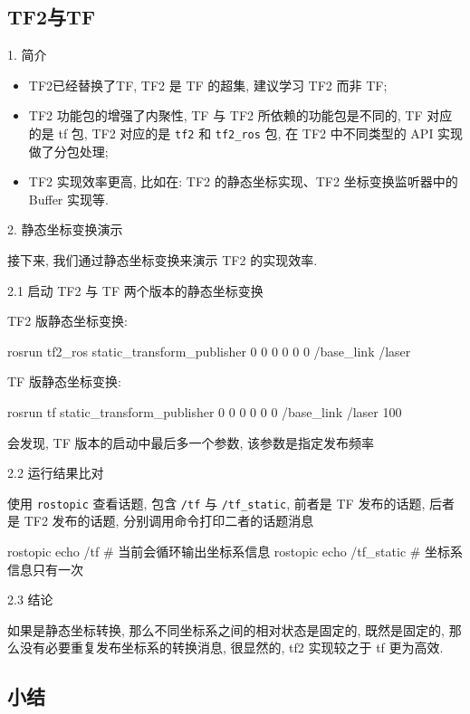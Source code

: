 \documentclass[openany, fontset=windowsold]{ctexbook}
\theoremstyle{kaiti}
\theoremstyle{normal}
\begin{document}
\subsection{TF2与TF}

1. 简介

\begin{itemize}
  \item TF2已经替换了TF, TF2 是 TF 的超集, 建议学习 TF2 而非 TF;
  \item TF2 功能包的增强了内聚性, TF 与 TF2 所依赖的功能包是不同的, TF 对应的是 tf 包, TF2 对应的是 \verb|tf2| 和 \verb|tf2_ros| 包, 在 TF2 中不同类型的 API 实现做了分包处理;
  \item TF2 实现效率更高, 比如在: TF2 的静态坐标实现、TF2 坐标变换监听器中的 Buffer 实现等.
\end{itemize}

2. 静态坐标变换演示

接下来, 我们通过静态坐标变换来演示 TF2 的实现效率.

2.1 启动 TF2 与 TF 两个版本的静态坐标变换

TF2 版静态坐标变换:

\begin{bash}
  rosrun tf2_ros static_transform_publisher 0 0 0 0 0 0 /base_link /laser
\end{bash}

TF 版静态坐标变换:

\begin{bash}
  rosrun tf static_transform_publisher 0 0 0 0 0 0 /base_link /laser 100
\end{bash}

会发现, TF 版本的启动中最后多一个参数, 该参数是指定发布频率

2.2 运行结果比对

使用 \verb|rostopic| 查看话题, 包含 \verb|/tf| 与 \verb|/tf_static|, 前者是 TF 发布的话题, 后者是 TF2 发布的话题, 分别调用命令打印二者的话题消息

\begin{bash}
  rostopic echo /tf        # 当前会循环输出坐标系信息
  rostopic echo /tf_static # 坐标系信息只有一次
\end{bash}

2.3 结论

如果是静态坐标转换, 那么不同坐标系之间的相对状态是固定的, 既然是固定的, 那么没有必要重复发布坐标系的转换消息, 很显然的, tf2 实现较之于 tf 更为高效.

\subsection{小结}
\end{document}
